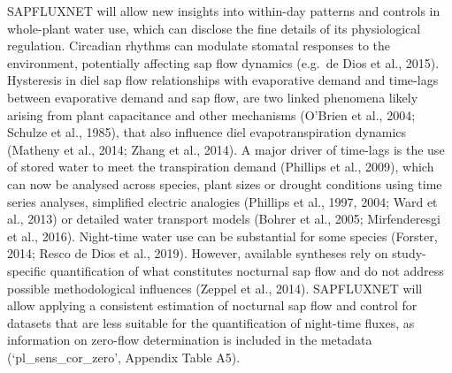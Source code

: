 \documentclass[11pt,twoside]{reedthesis}
\begin{document}
SAPFLUXNET will allow new insights into within-day patterns and controls
in whole-plant water use, which can disclose the fine details of its
physiological regulation. Circadian rhythms can modulate stomatal
responses to the environment, potentially affecting sap flow dynamics
(e.g.~de Dios et al., 2015). Hysteresis in diel sap flow relationships
with evaporative demand and time-lags between evaporative demand and sap
flow, are two linked phenomena likely arising from plant capacitance and
other mechanisms (O'Brien et al., 2004; Schulze et al., 1985), that also
influence diel evapotranspiration dynamics (Matheny et al., 2014; Zhang
et al., 2014). A major driver of time-lags is the use of stored water to
meet the transpiration demand (Phillips et al., 2009), which can now be
analysed across species, plant sizes or drought conditions using time
series analyses, simplified electric analogies (Phillips et al., 1997,
2004; Ward et al., 2013) or detailed water transport models (Bohrer et
al., 2005; Mirfenderesgi et al., 2016). Night-time water use can be
substantial for some species (Forster, 2014; Resco de Dios et al.,
2019). However, available syntheses rely on study-specific
quantification of what constitutes nocturnal sap flow and do not address
possible methodological influences (Zeppel et al., 2014). SAPFLUXNET
will allow applying a consistent estimation of nocturnal sap flow and
control for datasets that are less suitable for the quantification of
night-time fluxes, as information on zero-flow determination is included
in the metadata (`pl\_sens\_cor\_zero', Appendix Table A5).\par
\end{document}
